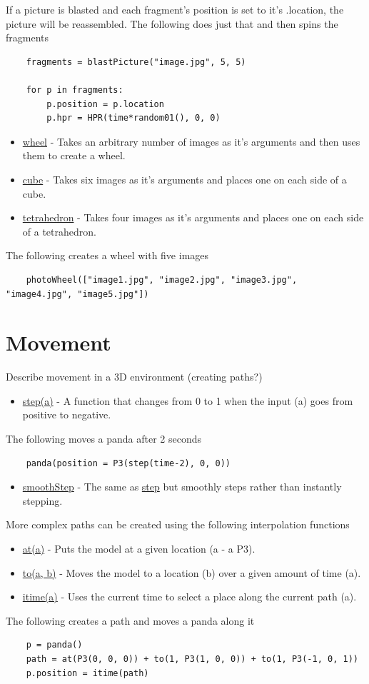 \documentclass[10pt]{article}
\begin{document}
If a picture is blasted and each fragment's position is set to it's .location, the picture will be reassembled.
The following does just that and then spins the fragments 
\begin{lstlisting}
    fragments = blastPicture("image.jpg", 5, 5)

    for p in fragments:
        p.position = p.location
        p.hpr = HPR(time*random01(), 0, 0)
\end{lstlisting}
\begin{itemize}
    \item \underline{wheel} - Takes an arbitrary number of images as it's arguments and then uses them to create a wheel.
    \item \underline{cube} - Takes six images as it's arguments and places one on each side of a cube.
    \item \underline{tetrahedron} - Takes four images as it's arguments and places one on each side of a tetrahedron.
\end{itemize}
The following creates a wheel with five images
\begin{lstlisting}
    photoWheel(["image1.jpg", "image2.jpg", "image3.jpg", "image4.jpg", "image5.jpg"])
\end{lstlisting}



\section*{Movement}
Describe movement in a 3D environment (creating paths?)
\begin{itemize}
    \item \underline{step(a)} - A function that changes from 0 to 1 when the input (a) goes from positive to negative.
\end{itemize}
The following moves a panda after 2 seconds
\begin{lstlisting}
    panda(position = P3(step(time-2), 0, 0))
\end{lstlisting}
\begin{itemize}
    \item \underline{smoothStep} - The same as \underline{step} but smoothly steps rather than instantly stepping.
\end{itemize}
More complex paths can be created using the following interpolation functions
\begin{itemize}
    \item \underline{at(a)} - Puts the model at a given location (a - a P3).
    \item \underline{to(a, b)} - Moves the model to a location (b) over a given amount of time (a).
    \item \underline{itime(a)} - Uses the current time to select a place along the current path (a).
\end{itemize}
The following creates a path and moves a panda along it
\begin{lstlisting}
    p = panda()
    path = at(P3(0, 0, 0)) + to(1, P3(1, 0, 0)) + to(1, P3(-1, 0, 1))
    p.position = itime(path)
\end{lstlisting}
\end{document}
